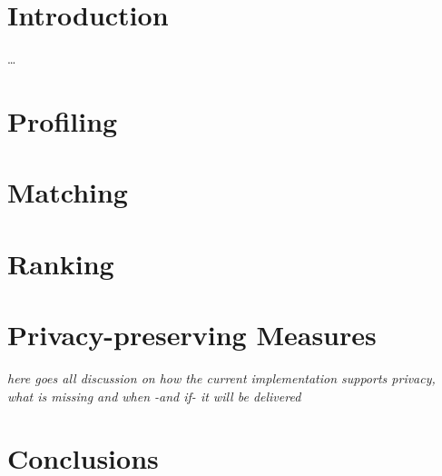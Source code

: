 \documentclass{SmartReport}
\begin{document}
\newpage


\section{Introduction}
\label{sec:intro}
\ldots

\newpage


\section{Profiling}
\label{sec:profiling}


\section{Matching}
\label{sec:matching}


\section{Ranking}
\label{sec:ranking}


\section{Privacy-preserving Measures}
{\it here goes all discussion on how the current implementation
  supports privacy, what is missing and when -and if- it will be delivered}


\section{Conclusions}
\label{sec:concl}

\newpage



%
\end{document}
